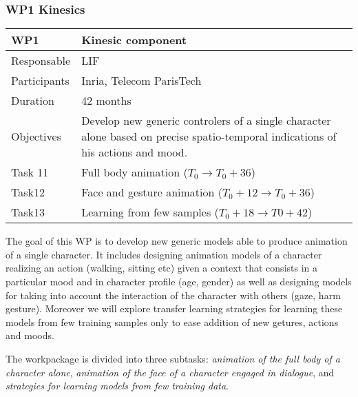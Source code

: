 

\subsubsection{WP1 Kinesics}


\begin{center}
\begin{tabular}{|p{3cm}|p{8cm}|}\hline
WP1 &  Kinesic component \\\hline
Responsable &  LIF  \\\hline
Participants &  Inria, Telecom ParisTech\\\hline
Duration  &  42 months  \\\hline
Objectives &  Develop new generic controlers of a single character alone based on precise spatio-temporal indications of his actions and mood. \\\hline
Task 11 & Full body animation  ($T_0 \rightarrow  T_0+36$) \\\hline
Task12 &  Face and gesture animation ($T_0+12 \rightarrow T_0+36$) \\\hline
Task13 &  Learning from few samples ($T_0+18 \rightarrow  T0+42$) \\\hline
\end{tabular}
\end{center}



The goal of this WP is to develop new generic models able to produce animation of a single character. It includes designing animation models of a character realizing an action (walking, sitting etc) given a context that consists in a particular mood and in character profile (age, gender) as well as designing models for taking into account the interaction of the character with others (gaze, harm gesture). Moreover we will explore transfer learning strategies for learning these models from few training samples only to ease addition of new getures, actions and moods. 

The workpackage is divided into three subtasks: {\it animation of the full body of a character alone}, {\it animation of the face of a character engaged in dialogue}, and {\it strategies for learning models from few training data}.

 


